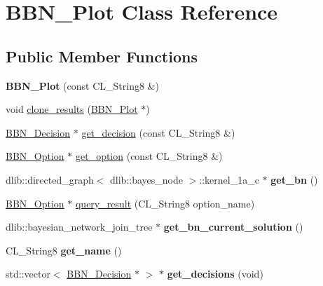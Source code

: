 \hypertarget{classBBN__Plot}{
\section{BBN\_\-Plot Class Reference}
\label{classBBN__Plot}
}
\subsection*{Public Member Functions}
\begin{DoxyCompactItemize}
\item 
\hypertarget{classBBN__Plot_a66943526f85b22923556702314feca2f}{
{\bfseries BBN\_\-Plot} (const CL\_\-String8 \&)}
\label{classBBN__Plot_a66943526f85b22923556702314feca2f}

\item 
void \hyperlink{classBBN__Plot_afbaf527d64694381a4e334b312cec999}{clone\_\-results} (\hyperlink{classBBN__Plot}{BBN\_\-Plot} $\ast$)
\item 
\hyperlink{classBBN__Decision}{BBN\_\-Decision} $\ast$ \hyperlink{classBBN__Plot_ad32d5c77cfd6d8578745993a60c35f06}{get\_\-decision} (const CL\_\-String8 \&)
\item 
\hyperlink{classBBN__Option}{BBN\_\-Option} $\ast$ \hyperlink{classBBN__Plot_a8ad3137651f387777f10468d387c6ad6}{get\_\-option} (const CL\_\-String8 \&)
\item 
\hypertarget{classBBN__Plot_a5733b2ec425b5e581553e7475de17867}{
dlib::directed\_\-graph$<$ dlib::bayes\_\-node $>$::kernel\_\-1a\_\-c $\ast$ {\bfseries get\_\-bn} ()}
\label{classBBN__Plot_a5733b2ec425b5e581553e7475de17867}

\item 
\hyperlink{classBBN__Option}{BBN\_\-Option} $\ast$ \hyperlink{classBBN__Plot_a153f754321621e1ca25d7ce39a8f6107}{query\_\-result} (CL\_\-String8 option\_\-name)
\item 
\hypertarget{classBBN__Plot_ae2bb301d2284498bfd0485625b368c35}{
dlib::bayesian\_\-network\_\-join\_\-tree $\ast$ {\bfseries get\_\-bn\_\-current\_\-solution} ()}
\label{classBBN__Plot_ae2bb301d2284498bfd0485625b368c35}

\item 
\hypertarget{classBBN__Plot_aabd7794d6a653bdb9444eef9d9d54d48}{
CL\_\-String8 {\bfseries get\_\-name} ()}
\label{classBBN__Plot_aabd7794d6a653bdb9444eef9d9d54d48}

\item 
\hypertarget{classBBN__Plot_ad161d3dcd566b1bcc14dd67de6dc9892}{
std::vector$<$ \hyperlink{classBBN__Decision}{BBN\_\-Decision} $\ast$ $>$ $\ast$ {\bfseries get\_\-decisions} (void)}
\label{classBBN__Plot_ad161d3dcd566b1bcc14dd67de6dc9892}


\end{DoxyCompactItemize}
